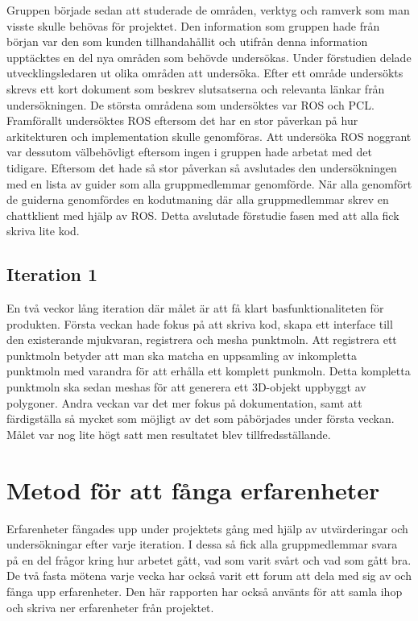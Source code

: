 Gruppen började sedan att studerade de områden, verktyg och ramverk som man visste skulle behövas för projektet. Den information som gruppen hade från början var den som kunden tillhandahållit och utifrån denna information upptäcktes en del nya områden som behövde undersökas. Under förstudien delade utvecklingsledaren ut olika områden att undersöka. Efter ett område undersökts skrevs ett kort dokument som beskrev slutsatserna och relevanta länkar från undersökningen. De största områdena som undersöktes var ROS och PCL. Framförallt undersöktes ROS eftersom det har en stor påverkan på hur arkitekturen och implementation skulle genomföras. Att undersöka ROS noggrant var dessutom välbehövligt eftersom ingen i gruppen hade arbetat med det tidigare. Eftersom det hade så stor påverkan så avslutades den undersökningen med en lista av guider som alla gruppmedlemmar genomförde. När alla genomfört de guiderna genomfördes en kodutmaning där alla gruppmedlemmar skrev en chattklient med hjälp av ROS. Detta avslutade förstudie fasen med att alla fick skriva lite kod. 

\subsection{Iteration 1}

En två veckor lång iteration där målet är att få klart basfunktionaliteten för produkten. Första veckan hade fokus på att skriva kod, skapa ett interface till den existerande mjukvaran, registrera och mesha punktmoln. Att registrera ett punktmoln betyder att man ska matcha en uppsamling av inkompletta punktmoln med varandra för att erhålla ett komplett punkmoln. Detta kompletta punktmoln ska sedan meshas för att generera ett 3D-objekt uppbyggt av polygoner. Andra veckan var det mer fokus på dokumentation, samt att färdigställa så mycket som möjligt av det som påbörjades under första veckan. Målet var nog lite högt satt men resultatet blev tillfredsställande.

\section{Metod för att fånga erfarenheter}

Erfarenheter fångades upp under projektets gång med hjälp av utvärderingar och undersökningar efter varje iteration. I dessa så fick alla gruppmedlemmar svara på en del frågor kring hur arbetet gått, vad som varit svårt och vad som gått bra. De två fasta mötena varje vecka har också varit ett forum att dela med sig av och fånga upp erfarenheter. Den här rapporten har också använts för att samla ihop och skriva ner erfarenheter från projektet. 



